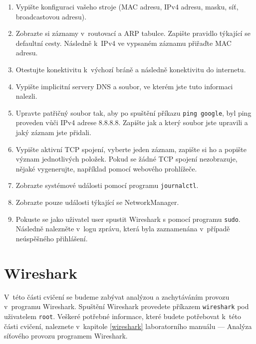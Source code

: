 \begin{enumerate}
\item Vypište konfiguraci vašeho stroje (MAC adresu, IPv4 adresu, masku, síť, broadcastovou adresu).
\item Zobrazte si záznamy v~routovací a ARP tabulce. Zapište pravidlo týkající se defaultní cesty. Následně k~IPv4 ve vypsaném záznamu přiřaďte MAC adresu.
\item Otestujte konektivitu k~výchozí bráně a následně konektivitu do internetu.
\item Vypište implicitní servery DNS a soubor, ve kterém jste tuto informaci nalezli.
\item Upravte patřičný soubor tak, aby po spuštění příkazu \texttt{ping google},
  byl ping proveden vůči IPv4 adrese 8.8.8.8. Zapište jak a který soubor jste
    upravili a jaký záznam jste přidali.
\item Vypište aktivní TCP spojení, vyberte jeden záznam, zapište si ho a popište význam jednotlivých položek. Pokud se žádné TCP spojení nezobrazuje, nějaké vygenerujte, například pomocí webového prohlížeče.
\item Zobrazte systémové události pomocí programu \texttt{journalctl}.
\item Zobrazte pouze události týkající se NetworkManager.
\item Pokuste se jako uživatel user spustit Wireshark s pomocí programu \texttt{sudo}. Následně nalezněte v~logu zprávu, která byla zaznamenána v~případě neúspěšného přihlášení.
\end{enumerate}

\section{Wireshark}
V~této části cvičení se budeme zabývat analýzou a zachytáváním provozu
v~programu Wireshark. Spuštění Wireshark provedete příkazem \texttt{wireshark}
pod uživatelem \texttt{root}. Veškeré potřebné informace, které budete
potřebovat k~této části cvičení, naleznete v~kapitole \ref{wireshark} laboratorního manuálu
--- Analýza síťového provozu programem Wireshark.

